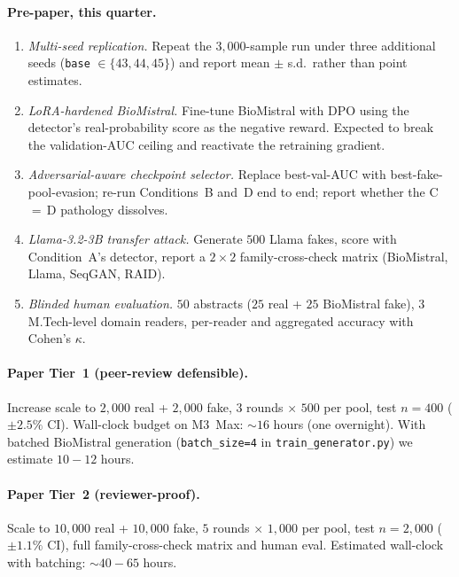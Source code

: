 \documentclass[conference]{IEEEtran}
\begin{document}
\paragraph{Pre-paper, this quarter.}
\begin{enumerate}[leftmargin=*]
\item \emph{Multi-seed replication.} Repeat the
  \(3{,}000\)-sample run under three additional seeds
  (\texttt{base} $\in \{43, 44, 45\}$) and report mean $\pm$ s.d.\
  rather than point estimates.
\item \emph{LoRA-hardened BioMistral.} Fine-tune BioMistral with DPO
  using the detector's real-probability score as the negative reward.
  Expected to break the validation-AUC ceiling and reactivate the
  retraining gradient.
\item \emph{Adversarial-aware checkpoint selector.} Replace
  best-val-AUC with best-fake-pool-evasion; re-run Conditions~B and~D
  end to end; report whether the C\,$=$\,D pathology dissolves.
\item \emph{Llama-3.2-3B transfer attack.} Generate \(500\) Llama
  fakes, score with Condition~A's detector, report a \(2\times 2\)
  family-cross-check matrix (BioMistral, Llama, SeqGAN, RAID).
\item \emph{Blinded human evaluation.} \(50\) abstracts (\(25\)
  real + \(25\) BioMistral fake), \(3\) M.Tech-level domain readers,
  per-reader and aggregated accuracy with Cohen's $\kappa$.
\end{enumerate}

\paragraph{Paper Tier~1 (peer-review defensible).}
Increase scale to \(2{,}000\) real + \(2{,}000\) fake, \(3\) rounds
$\times$ \(500\) per pool, test \(n=400\) (\(\pm 2.5\%\) CI). Wall-clock
budget on M3~Max: $\sim$\(16\) hours (one overnight). With batched
BioMistral generation (\texttt{batch\_size=4} in
\texttt{train\_generator.py}) we estimate
\(10\!-\!12\) hours.

\paragraph{Paper Tier~2 (reviewer-proof).}
Scale to \(10{,}000\) real + \(10{,}000\) fake, \(5\) rounds $\times$
\(1{,}000\) per pool, test \(n=2{,}000\) (\(\pm 1.1\%\) CI), full
family-cross-check matrix and human eval. Estimated wall-clock with
batching: $\sim$\(40\!-\!65\) hours.
\end{document}
